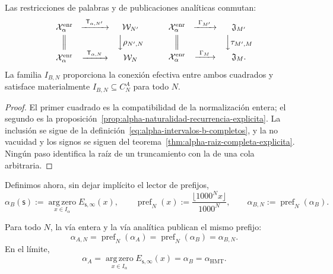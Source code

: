 \begin{proposition}
\label{prop:alpha-cuadrados-compatibilidad}
Las restricciones de palabras y de publicaciones analíticas conmutan:
\[
\begin{array}{ccc}
 \mathcal X_\alpha^{\mathrm{enr}}&
 \xrightarrow{\ \mathsf T_{\alpha,N'}\ }&\mathcal W_{N'}\\[1mm]
 \Big\Vert&&\Big\downarrow\rho_{N',N}\\[1mm]
 \mathcal X_\alpha^{\mathrm{enr}}&
 \xrightarrow{\ \mathsf T_{\alpha,N}\ }&\mathcal W_N
\end{array}
\qquad
\begin{array}{ccc}
 \mathcal X_\alpha^{\mathrm{enr}}&
 \xrightarrow{\ \Gamma_{M'}\ }&\mathfrak J_{M'}\\[1mm]
 \Big\Vert&&\Big\downarrow\tau_{M',M}\\[1mm]
 \mathcal X_\alpha^{\mathrm{enr}}&
 \xrightarrow{\ \Gamma_M\ }&\mathfrak J_M .
\end{array}
\]
La familia \(I_{B,N}\) proporciona la conexión efectiva entre ambos
cuadrados y satisface materialmente
\(I_{B,N}\subseteq C_N^A\) para todo \(N\).
\end{proposition}

\begin{proof}
El primer cuadrado es la compatibilidad de la normalización entera; el segundo
es la proposición~\ref{prop:alpha-naturalidad-recurrencia-explicita}. La
inclusión se sigue de la definición~\eqref{eq:alpha-intervalos-b-completos},
y la no vacuidad y los signos se siguen del
teorema~\ref{thm:alpha-raiz-completa-explicita}. Ningún paso identifica la
raíz de un truncamiento con la de una cola arbitraria.
\end{proof}

Definimos ahora, sin dejar implícito el lector de prefijos,
\begin{equation}
 \alpha_B(\mathsf s):=
 \operatorname*{arg\,zero}_{x\in I_\alpha}E_{\mathsf s,\infty}(x),
 \qquad
 \operatorname{pref}_N(x):=
 \frac{\lfloor1000^Nx\rfloor}{1000^N},
 \qquad
 \alpha_{B,N}:=\operatorname{pref}_N(\alpha_B).
 \label{eq:alpha-definicion-b-y-prefijos-rev08}
\end{equation}

\begin{theorem}
\label{prop:alpha-dos-limites}
Para todo \(N\), la vía entera y la vía analítica publican el mismo prefijo:
\begingroup
\renewcommand{\theequation}{A7\(_0\)}
\begin{equation}
 \boxed{\alpha_{A,N}=\operatorname{pref}_N(\alpha_A)
 =\operatorname{pref}_N(\alpha_B)=\alpha_{B,N}.}
 \label{eq:alpha-dos-vias-cada-nivel}
\end{equation}
\endgroup
En el límite,
\begingroup
\renewcommand{\theequation}{A8\(_0\)}
\begin{equation}
 \boxed{\alpha_A
 =\operatorname*{arg\,zero}_{x\in I_\alpha}
       E_{\mathsf s,\infty}(x)
 =\alpha_B=\alpha_{\mathrm{HMT}}.}
 \label{eq:alpha-dos-vias-limite-coinductivo}
\end{equation}
\endgroup
\end{theorem}

